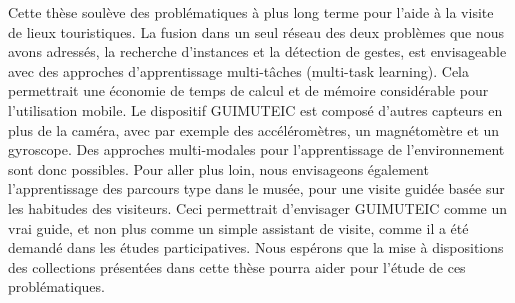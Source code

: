 Cette thèse soulève des problématiques à plus long terme pour l’aide à la visite de lieux touristiques. 
La fusion dans un seul réseau des deux problèmes que nous avons adressés, la recherche d’instances et la détection de gestes, est envisageable avec des approches d’apprentissage multi-tâches (multi-task learning).
Cela permettrait une économie de temps de calcul et de mémoire considérable pour l’utilisation mobile.
Le dispositif GUIMUTEIC est composé d’autres capteurs en plus de la caméra, avec par exemple des accéléromètres, un magnétomètre et un gyroscope. 
Des approches multi-modales pour l’apprentissage de l'environnement sont donc possibles. 
Pour aller plus loin, nous envisageons également l’apprentissage des parcours type dans le musée, pour une visite guidée basée sur les habitudes des visiteurs.
Ceci permettrait d’envisager GUIMUTEIC comme un vrai guide, et non plus comme un simple assistant de visite, comme il a été demandé dans les études participatives.
Nous espérons que la mise à dispositions des collections présentées dans cette thèse pourra aider pour l’étude de ces problématiques.


